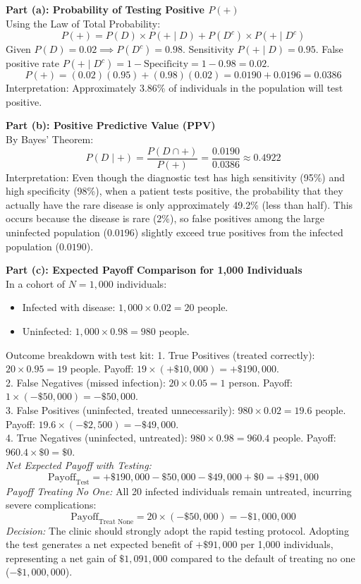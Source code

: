 \begin{frqrubricbox}
\textbf{Part (a): Probability of Testing Positive $P(+)$}\\
Using the Law of Total Probability:
\[ P(+) = P(D) \times P(+ \mid D) + P(D^c) \times P(+ \mid D^c) \]
Given $P(D) = 0.02 \implies P(D^c) = 0.98$.
Sensitivity $P(+ \mid D) = 0.95$.
False positive rate $P(+ \mid D^c) = 1 - \text{Specificity} = 1 - 0.98 = 0.02$.
\[ P(+) = (0.02)(0.95) + (0.98)(0.02) = 0.0190 + 0.0196 = 0.0386 \]
Interpretation: Approximately 3.86\% of individuals in the population will test positive.

\textbf{Part (b): Positive Predictive Value (PPV)}\\
By Bayes' Theorem:
\[ P(D \mid +) = \frac{P(D \cap +)}{P(+)} = \frac{0.0190}{0.0386} \approx 0.4922 \]
Interpretation: Even though the diagnostic test has high sensitivity (95\%) and high specificity (98\%), when a patient tests positive, the probability that they actually have the rare disease is only approximately 49.2\% (less than half). This occurs because the disease is rare ($2\%$), so false positives among the large uninfected population ($0.0196$) slightly exceed true positives from the infected population ($0.0190$).

\textbf{Part (c): Expected Payoff Comparison for 1,000 Individuals}\\
In a cohort of $N = 1,000$ individuals:
\begin{itemize}
  \item Infected with disease: $1,000 \times 0.02 = 20$ people.
  \item Uninfected: $1,000 \times 0.98 = 980$ people.
\end{itemize}
Outcome breakdown with test kit:
1. True Positives (treated correctly): $20 \times 0.95 = 19$ people. Payoff: $19 \times (+\$10,000) = +\$190,000$.\\
2. False Negatives (missed infection): $20 \times 0.05 = 1$ person. Payoff: $1 \times (-\$50,000) = -\$50,000$.\\
3. False Positives (uninfected, treated unnecessarily): $980 \times 0.02 = 19.6$ people. Payoff: $19.6 \times (-\$2,500) = -\$49,000$.\\
4. True Negatives (uninfected, untreated): $980 \times 0.98 = 960.4$ people. Payoff: $960.4 \times \$0 = \$0$.\\
\textit{Net Expected Payoff with Testing:}
\[ \text{Payoff}_{\text{Test}} = +\$190,000 - \$50,000 - \$49,000 + \$0 = +\$91,000 \]
\textit{Payoff Treating No One:}
All 20 infected individuals remain untreated, incurring severe complications:
\[ \text{Payoff}_{\text{Treat None}} = 20 \times (-\$50,000) = -\$1,000,000 \]
\textit{Decision:} The clinic should strongly adopt the rapid testing protocol. Adopting the test generates a net expected benefit of $+\$91,000$ per 1,000 individuals, representing a net gain of $\$1,091,000$ compared to the default of treating no one ($-\$1,000,000$).


\end{frqrubricbox}
